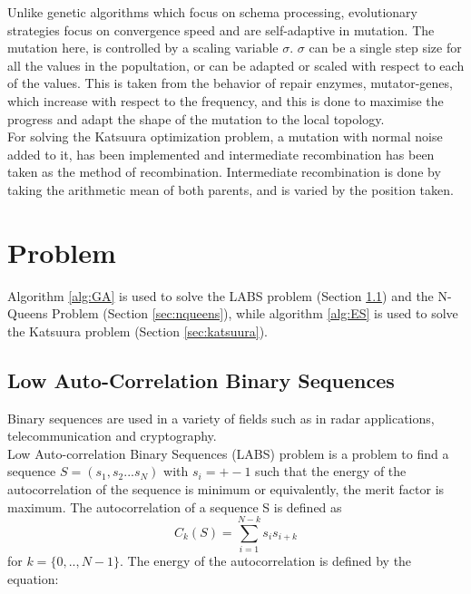 \documentclass{article}
\begin{document}
Unlike genetic algorithms which focus on schema processing, evolutionary strategies focus on convergence speed and are self-adaptive in mutation. The mutation here, is controlled by a scaling variable $\sigma$. $\sigma$ can be a single step size for all the values in the popultation, or can be adapted or scaled with respect to each of the values.  This is taken from the behavior of repair enzymes, mutator-genes, which increase with respect to the frequency, and this is done to maximise the progress and adapt the shape of the mutation to the local topology. \cite{hao-paper-evostrat} \\
For solving the Katsuura optimization problem, a mutation with normal noise added to it, has been implemented and intermediate recombination has been taken as the method of recombination. Intermediate recombination is done by taking the arithmetic mean of both parents, and is varied by the position taken.

\section{Problem}
Algorithm \ref{alg:GA} is used to solve the LABS problem (Section \ref{sec:labs}) and the N-Queens Problem (Section \ref{sec:nqueens}), while algorithm \ref{alg:ES} is used to solve the Katsuura problem (Section \ref{sec:katsuura}). 
\subsection{Low Auto-Correlation Binary Sequences}\label{sec:labs}
Binary sequences are used in a variety of fields such as in radar applications, telecommunication and cryptography. \\
Low Auto-correlation Binary Sequences (LABS) problem is a problem to find a sequence $S = (s_1, s_2 ... s_N)$ with $ s_i = +-1$ such that the energy of the autocorrelation of the sequence is minimum or equivalently, the merit factor is maximum.  The autocorrelation of a sequence S is defined as 
\begin{equation*}
    C_k(S) = \sum_{i=1}^{N-k}s_is_{i+k}
\end{equation*}
for $k  = \{0,..,N-1\}$. The energy of the autocorrelation is defined by the equation: 
\end{document}
